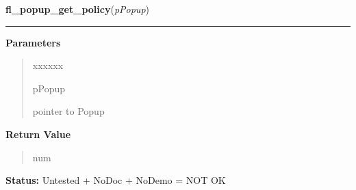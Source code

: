 \hspace{.8\funcindent}\begin{boxedminipage}{\funcwidth}

    \raggedright \textbf{fl\_popup\_get\_policy}(\textit{pPopup})

    \vspace{-1.5ex}

    \rule{\textwidth}{0.5\fboxrule}
\setlength{\parskip}{2ex}
\setlength{\parskip}{1ex}
      \textbf{Parameters}
      \vspace{-1ex}

      \begin{quote}
        \begin{Ventry}{xxxxxx}

          \item[pPopup]

          pointer to Popup

        \end{Ventry}

      \end{quote}

      \textbf{Return Value}
    \vspace{-1ex}

      \begin{quote}
      num

      \end{quote}

\textbf{Status:} Untested + NoDoc + NoDemo = NOT OK



    \end{boxedminipage}

    \label{xformslib:library:fl_popup_set_policy}

    \vspace{0.5ex}

